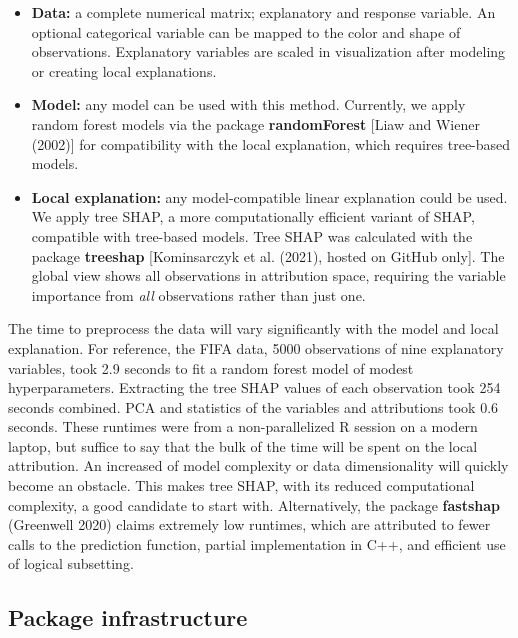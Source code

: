 \documentclass[
  article]{article}
\begin{document}
\begin{itemize}
    \item \textbf{Data:} a complete numerical matrix; explanatory and response variable. An optional categorical variable can be mapped to the color and shape of observations. Explanatory variables are scaled in visualization after modeling or creating local explanations. 
    \item \textbf{Model:} any model can be used with this method. Currently, we apply random forest models via the package \textbf{randomForest} [Liaw and Wiener (2002)] for compatibility with the local explanation, which requires tree-based models.
    \item \textbf{Local explanation:} any model-compatible linear explanation could be used. We apply tree SHAP, a more computationally efficient variant of SHAP, compatible with tree-based models. Tree SHAP was calculated with the package \textbf{treeshap} [Kominsarczyk et al. (2021), hosted on GitHub only]. The global view shows all observations in attribution space, requiring the variable importance from \emph{all} observations rather than just one.
\end{itemize}

The time to preprocess the data will vary significantly with the model and local explanation. For reference, the FIFA data, 5000 observations of nine explanatory variables, took 2.9 seconds to fit a random forest model of modest hyperparameters. Extracting the tree SHAP values of each observation took 254 seconds combined. PCA and statistics of the variables and attributions took 0.6 seconds. These runtimes were from a non-parallelized R session on a modern laptop, but suffice to say that the bulk of the time will be spent on the local attribution. An increased of model complexity or data dimensionality will quickly become an obstacle. This makes tree SHAP, with its reduced computational complexity, a good candidate to start with. Alternatively, the package \textbf{fastshap} (Greenwell 2020) claims extremely low runtimes, which are attributed to fewer calls to the prediction function, partial implementation in C++, and efficient use of logical subsetting.

\hypertarget{sec:infrastructure}{%
\subsection{Package infrastructure}\label{sec:infrastructure}}
\end{document}
